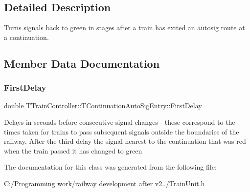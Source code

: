 \subsection{Detailed Description}
Turns signals back to green in stages after a train has exited an autosig route at a continuation. 

\subsection{Member Data Documentation}
\mbox{\label{class_t_train_controller_1_1_t_continuation_auto_sig_entry_ab5a944eed2be17d13d99a9070f78c785}} 
\subsubsection{\texorpdfstring{First\+Delay}{FirstDelay}}
{\footnotesize\ttfamily double T\+Train\+Controller\+::\+T\+Continuation\+Auto\+Sig\+Entry\+::\+First\+Delay}

Delays in seconds before consecutive signal changes -\/ these correspond to the times taken for trains to pass subsequent signals outside the boundaries of the railway. After the third delay the signal nearest to the continuation that was red when the train passed it has changed to green 

The documentation for this class was generated from the following file\+:\begin{DoxyCompactItemize}
\item 
C\+:/\+Programming work/railway development after v2../Train\+Unit.\+h\end{DoxyCompactItemize}
